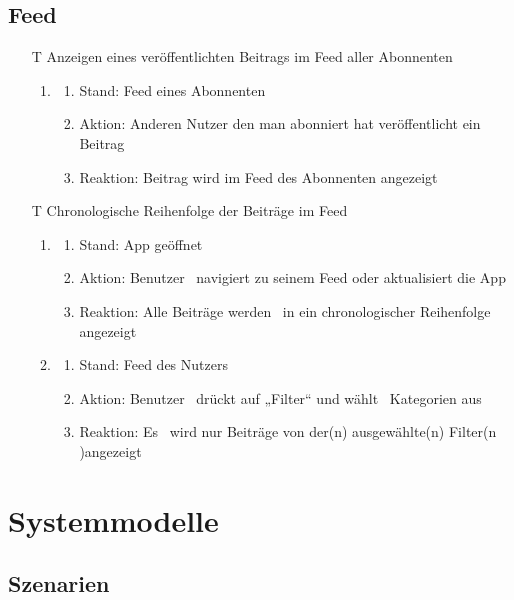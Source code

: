 \documentclass[parskip=full]{scrartcl}
\begin{document}
	\subsection{Feed}
		\begin{itemize}
			\item[T] Anzeigen eines veröffentlichten Beitrags im Feed aller Abonnenten
\begin{enumerate}
	\item
	\begin{enumerate}[nosep]	
	\item Stand: Feed eines Abonnenten
	\item Aktion: Anderen Nutzer den man abonniert hat veröffentlicht ein Beitrag
	\item Reaktion: Beitrag wird im Feed des Abonnenten angezeigt
\end{enumerate} 
\end{enumerate}

\item[T]  Chronologische Reihenfolge der Beiträge im Feed
\begin{enumerate}
	\item
	\begin{enumerate}[nosep]	
	\item Stand: App geöffnet
	\item Aktion: Benutzer  navigiert zu seinem Feed oder aktualisiert die App
	\item Reaktion:  Alle Beiträge werden  in ein chronologischer Reihenfolge angezeigt
\end{enumerate} 
\item
	\begin{enumerate}[nosep]	
	\item Stand: Feed des Nutzers
	\item Aktion: Benutzer  drückt auf „Filter“ und wählt  Kategorien aus
	\item Reaktion: Es  wird nur Beiträge von der(n) ausgewählte(n) Filter(n )angezeigt
\end{enumerate}
\end{enumerate}
		\end{itemize}

	
	\newpage
	\section{Systemmodelle}
	\subsection{Szenarien}
\end{document}
